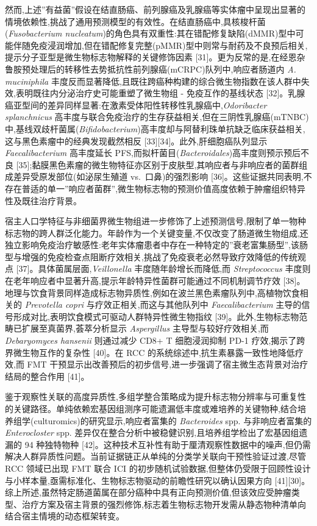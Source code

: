 \documentclass[11pt]{article}
\begin{document}
然而,上述''有益菌''假设在结直肠癌、前列腺癌及乳腺癌等实体瘤中呈现出显著的情境依赖性,挑战了通用预测模型的有效性。在结直肠癌中,具核梭杆菌(\emph{Fusobacterium nucleatum})的角色具有双重性:其在错配修复缺陷(dMMR)型中可能伴随免疫浸润增加,但在错配修复完整(pMMR)型中则常与耐药及不良预后相关,提示分子亚型是微生物标志物解释的关键修饰因素 {[}31{]}。更为反常的是,在经恩杂鲁胺预处理后的转移性去势抵抗性前列腺癌(mCRPC)队列中,响应者肠道内 \emph{A. muciniphila} 丰度反而显著降低,且既往跨癌种构建的综合微生物指数在该人群中失效,表明既往内分泌治疗史可能重塑了微生物组 - 免疫互作的基线状态 {[}32{]}。乳腺癌亚型间的差异同样显著:在激素受体阳性转移性乳腺癌中,\emph{Odoribacter splanchnicus} 高丰度与联合免疫治疗的生存获益相关,但在三阴性乳腺癌(mTNBC)中,基线双歧杆菌属(\emph{Bifidobacterium})高丰度却与阿替利珠单抗缺乏临床获益相关,这与黑色素瘤中的经典发现截然相反 {[}33{]}{[}34{]}。此外,肝细胞癌队列显示 \emph{Faecalibacterium} 高丰度延长 PFS,而拟杆菌目(\emph{Bacteroidales})高丰度则预示预后不良 {[}35{]};黏膜黑色素瘤的微生物特征亦区别于皮肤型,其响应者与非响应者的菌群组成差异受原发部位(如泌尿生殖道 vs.~口鼻)的强烈影响 {[}36{]}。这些证据共同表明,不存在普适的单一''响应者菌群'',微生物标志物的预测价值高度依赖于肿瘤组织特异性及既往治疗背景。

宿主人口学特征与非细菌界微生物组进一步修饰了上述预测信号,限制了单一物种标志物的跨人群泛化能力。年龄作为一个关键变量,不仅改变了肠道微生物组成,还独立影响免疫治疗敏感性:老年实体瘤患者中存在一种特定的''衰老富集肠型'',该肠型与增强的免疫检查点阻断疗效相关,挑战了免疫衰老必然导致疗效降低的传统观点 {[}37{]}。具体菌属层面,\emph{Veillonella} 丰度随年龄增长而降低,而 \emph{Streptococcus} 丰度则在老年响应者中显著升高,提示年龄特异性菌群可能通过不同机制调节疗效 {[}38{]}。地理与饮食背景同样造成标志物异质性,例如在波兰黑色素瘤队列中,高植物饮食相关的 \emph{Prevotella copri} 与疗效正相关,而这与其他队列中 \emph{Faecalibacterium} 主导的信号形成对比,表明饮食模式可驱动人群特异性微生物指纹 {[}39{]}。此外,生物标志物范畴已扩展至真菌界,荟萃分析显示 \emph{Aspergillus} 主导型与较好疗效相关,而 \emph{Debaryomyces hansenii} 则通过减少 CD8+ T 细胞浸润抑制 PD-1 疗效,揭示了跨界微生物互作的复杂性 {[}40{]}。在 RCC 的系统综述中,抗生素暴露一致性地降低疗效,而 FMT 干预显示出改善预后的初步信号,进一步强调了宿主微生态背景对治疗结局的整合作用 {[}41{]}。

鉴于观察性关联的高度异质性,多组学整合策略成为提升标志物分辨率与可重复性的关键路径。单纯依赖宏基因组测序可能遗漏低丰度或难培养的关键物种,结合培养组学(culturomics)的研究显示,响应者富集的 \emph{Bacteroides} spp. 与非响应者富集的 \emph{Enterocloster} spp. 差异仅在整合分析中被稳健识别,且培养组学检出了宏基因组遗漏的 94 种独特物种 {[}42{]}。这种技术互补性有助于厘清观察性数据中的噪声,但仍需解决人群异质性问题。当前证据链正从单纯的分类学关联向干预性验证过渡,尽管 RCC 领域已出现 FMT 联合 ICI 的初步随机试验数据,但整体仍受限于回顾性设计与小样本量,亟需标准化、生物标志物驱动的前瞻性研究以确认因果方向 {[}41{]}{[}30{]}。综上所述,虽然特定肠道菌属在部分癌种中具有正向预测价值,但该效应受肿瘤类型、治疗方案及宿主背景的强烈修饰,标志着生物标志物开发需从静态物种清单向结合宿主情境的动态框架转变。
\end{document}
